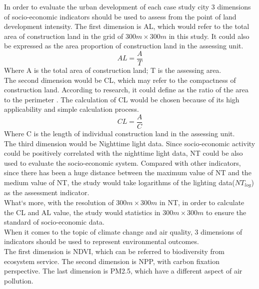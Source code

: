 In order to evaluate the urban development of each case study city 3 dimensions of socio-economic indicators should be used to assess from the point of land development intensity. 
The first dimension is AL, which would refer to the total area of construction land in the grid of $300m \times 300m$ in this study. It could also be expressed as the area proportion of construction land in the assessing unit.\\
\begin{equation}
AL=\frac{A}{T}
\end{equation}
Where A is the total area of construction land; T is the assessing area.\\

The second dimension would be CL, which may refer to the compactness of construction land. According to research, it could define as the ratio of the area to the perimeter \parencite{peng_integrating_2020}. The calculation of CL would be chosen because of its high applicability and simple calculation process.\\
\begin{equation}
CL=\frac{A}{C}
\end{equation}
Where C is the length of individual construction land in the assessing unit.\\

The third dimension would be Nighttime light data. Since socio-economic activity could be positively correlated with the nighttime light data, NT could be also used to evaluate the socio-economic system. Compared with other indicators, since there has been a huge distance between the maximum value of NT and the medium value of NT, the study would take logarithms of the lighting data($NT_{log}$) as the assessment indicator.\\

What‘s more, with the resolution of $300m \times 300m$ in NT, in order to calculate the CL and AL value, the study would statistics in $300m \times 300m$ to ensure the standard of socio-economic data.\\

When it comes to the topic of climate change and air quality, 3 dimensions of indicators should be used to represent environmental outcomes.\\

The first dimension is NDVI, which can be referred to biodiversity from ecosystem service. The second dimension is NPP, with carbon fixation perspective. The last dimension is PM2.5, which have a different aspect of air pollution.\\


